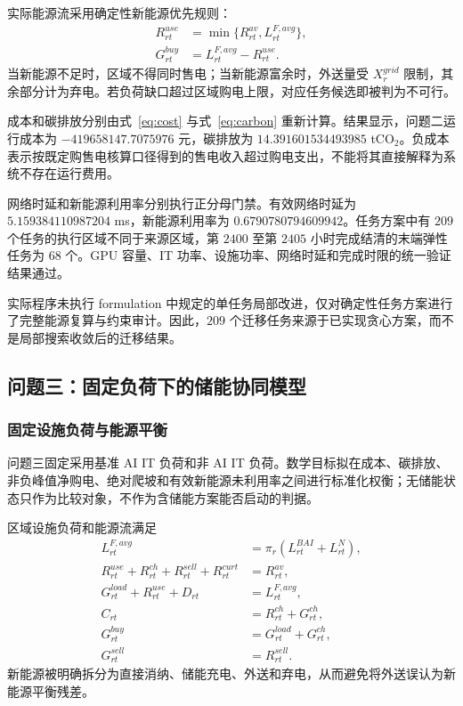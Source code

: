 实际能源流采用确定性新能源优先规则：
\begin{align}
R_{rt}^{use}&=\min\{R_{rt}^{av},L_{rt}^{F,avg}\},\\
G_{rt}^{buy}&=L_{rt}^{F,avg}-R_{rt}^{use}.
\end{align}
当新能源不足时，区域不得同时售电；当新能源富余时，外送量受 $X_r^{grid}$ 限制，其余部分计为弃电。若负荷缺口超过区域购电上限，对应任务候选即被判为不可行。

成本和碳排放分别由式~\eqref{eq:cost} 与式~\eqref{eq:carbon} 重新计算。结果显示，问题二运行成本为 $-419658147.7075976$ 元，碳排放为 $14.391601534493985$ tCO$_2$。负成本表示按既定购售电核算口径得到的售电收入超过购电支出，不能将其直接解释为系统不存在运行费用。

网络时延和新能源利用率分别执行正分母门禁。有效网络时延为 $5.159384110987204$ ms，新能源利用率为 $0.6790780794609942$。任务方案中有 $209$ 个任务的执行区域不同于来源区域，第 $2400$ 至第 $2405$ 小时完成结清的末端弹性任务为 $68$ 个。GPU 容量、IT 功率、设施功率、网络时延和完成时限的统一验证结果通过。

实际程序未执行 formulation 中规定的单任务局部改进，仅对确定性任务方案进行了完整能源复算与约束审计。因此，$209$ 个迁移任务来源于已实现贪心方案，而不是局部搜索收敛后的迁移结果。

\subsection{问题三：固定负荷下的储能协同模型}

\subsubsection{固定设施负荷与能源平衡}

问题三固定采用基准 AI IT 负荷和非 AI IT 负荷。数学目标拟在成本、碳排放、非负峰值净购电、绝对爬坡和有效新能源未利用率之间进行标准化权衡；无储能状态只作为比较对象，不作为含储能方案能否启动的判据。

区域设施负荷和能源流满足
\begin{align}
L_{rt}^{F,avg}
&=\pi_r(L_{rt}^{BAI}+L_{rt}^{N}), \label{eq:q3_load}\\
R_{rt}^{use}+R_{rt}^{ch}+R_{rt}^{sell}+R_{rt}^{curt}
&=R_{rt}^{av}, \label{eq:q3_re_balance}\\
G_{rt}^{load}+R_{rt}^{use}+D_{rt}
&=L_{rt}^{F,avg}, \label{eq:q3_load_balance}\\
C_{rt}&=R_{rt}^{ch}+G_{rt}^{ch},\\
G_{rt}^{buy}&=G_{rt}^{load}+G_{rt}^{ch},\\
G_{rt}^{sell}&=R_{rt}^{sell}.
\end{align}
新能源被明确拆分为直接消纳、储能充电、外送和弃电，从而避免将外送误认为新能源平衡残差。

